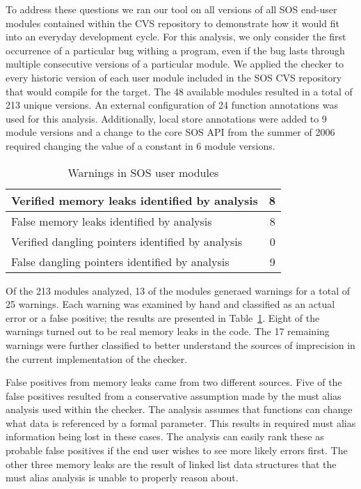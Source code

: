 To address these questions we ran our tool on all versions of all SOS
end-user modules contained within the CVS repository to demonstrate
how it would fit into an everyday development cycle.  For this
analysis, we only consider the first occurrence of a particular bug
withing a program, even if the bug lasts through multiple consecutive
versions of a particular module.  We applied the checker to every
historic version of each user module included in the SOS CVS
repository that would compile for the  target.  The 48
available modules resulted in a total of 213 unique versions.
%
An external configuration of 24 function annotations was used for this
analysis.  
%
Additionally, local store annotations were added to 9 module versions
and a change to the core SOS API from the summer of 2006 required
changing the value of a constant in 6 module versions.


\begin{table}
\caption{Warnings in SOS user modules}
%
\label{tab:module}
\centering 
\begin{tabular}{| l | r |}
    \hline 
    Verified memory leaks identified by analysis & 8 \\
    \hline
    False memory leaks identified by analysis & 8 \\
    \hline 
    Verified dangling pointers identified by analysis & 0 \\
    \hline 
    False dangling pointers identified by analysis & 9 \\
    \hline 
\end{tabular} 
%
\end{table}

Of the 213 modules analyzed, 13 of the modules generaed warnings for a
total of 25 warnings.
%
Each warning was examined by hand and classified as an actual error or
a false positive; the results are presented in Table~\ref{tab:module}.  
%
Eight of the warnings turned out to be real memory leaks in the code.
%
The 17 remaining warnings were further classified to better understand
the sources of imprecision in the current implementation of the
checker.  

\smallskip{}

False positives from memory leaks came from two different sources.
Five of the false positives resulted from a conservative assumption
made by the must alias analysis used within the checker.  The analysis
assumes that functions can change what data is referenced by a formal
parameter.  This results in required must alias information being lost
in these cases.  The analysis can easily rank these as probable false
positives if the end user wishes to see more likely errors first.  The
other three memory leaks are the result of linked list data structures
that the must alias analysis is unable to properly reason about.  

